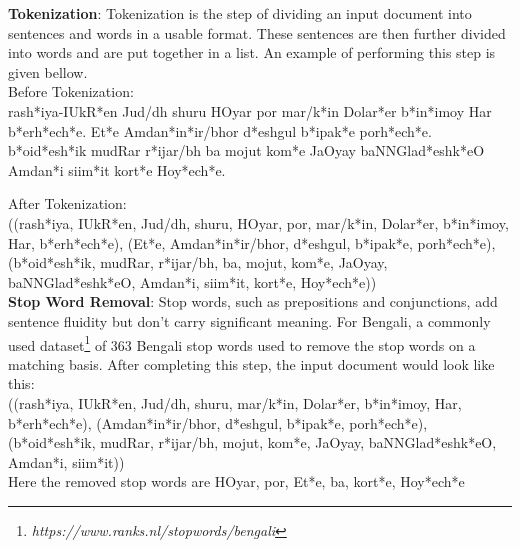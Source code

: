 \textbf{Tokenization}: Tokenization is the step of dividing an
input document into sentences and words in a usable format.
These sentences are then further divided into words and are put together in a list.
An example of performing this step is given bellow.\\
Before Tokenization:\\
{\bng
    ra\*sh*iya-IU\*kR*en Jud/dh shuru HOyar por ma\*r/k*in Dola\*r*er \*b*i\*n*imoy Har \*b*e\*rh*e\*ch*e.
    E\*t*e Amda\*n*i\*n*ir/bhor \*d*eshgul \*b*ipa\*k*e po\*rh*e\*ch*e.
    \*b*{oi}\*d*e\*sh*ik mudRar \*r*ijar/bh ba mojut ko\*m*e JaOyay baNNGla\*d*esh\*k*eO Amda\*n*i sii\*m*it
    kor\*t*e Ho\*y*e\*ch*e.
}

After Tokenization:\\
{\bng
    ((ra\*sh*iya, IU\*kR*en, Jud/dh, shuru, HOyar, por, ma\*r/k*in, Dola\*r*er, \*b*i\*n*imoy, Har, \*b*e\*rh*e\*ch*e),
    (E\*t*e, Amda\*n*i\*n*ir/bhor, \*d*eshgul, \*b*ipa\*k*e, po\*rh*e\*ch*e),
    (\*b*{oi}\*d*e\*sh*ik, mudRar, \*r*ijar/bh, ba, mojut, ko\*m*e, JaOyay, baNNGla\*d*esh\*k*eO, Amda\*n*i,
    sii\*m*it, kor\*t*e, Ho\*y*e\*ch*e))
}\\

\textbf{Stop Word Removal}: Stop words, such as prepositions and conjunctions,
add sentence fluidity but don’t carry significant meaning.
For Bengali, a commonly used dataset\footnote{\textit{https://www.ranks.nl/stopwords/bengali}} of 363 Bengali stop
words used to remove the stop words on a matching basis.
After completing this step, the input document would look like this:\\
{\bng
    ((ra\*sh*iya, IU\*kR*en, Jud/dh, shuru, ma\*r/k*in, Dola\*r*er, \*b*i\*n*imoy, Har, \*b*e\*rh*e\*ch*e),
    (Amda\*n*i\*n*ir/bhor, \*d*eshgul, \*b*ipa\*k*e, po\*rh*e\*ch*e),
    (\*b*{oi}\*d*e\*sh*ik, mudRar, \*r*ijar/bh, mojut, ko\*m*e, JaOyay, baNNGla\*d*esh\*k*eO, Amda\*n*i, sii\*m*it))
}\\
Here the removed stop words are {\bng HOyar, por, E\*t*e, ba, kor\*t*e, Ho\*y*e\*ch*e}\\

